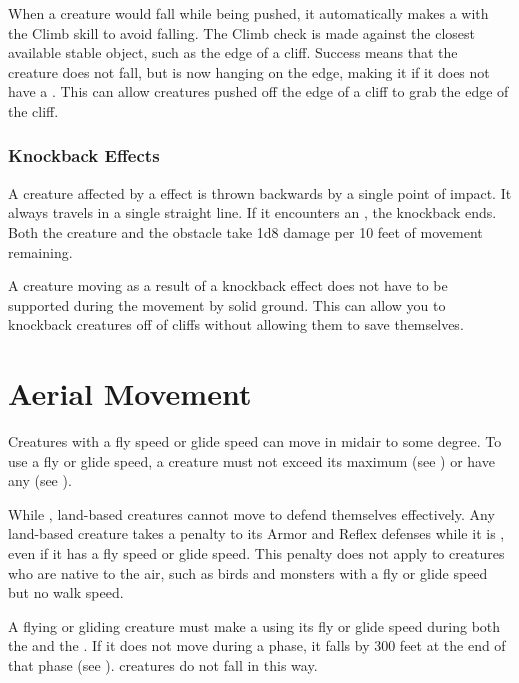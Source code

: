       When a creature would fall while being pushed, it automatically makes a  with the Climb skill to avoid falling.
      The Climb check is made against the closest available stable object, such as the edge of a cliff.
      Success means that the creature does not fall, but is now hanging on the edge, making it \unsteady if it does not have a .
      This can allow creatures pushed off the edge of a cliff to grab the edge of the cliff.

    \subsubsection{Knockback Effects}\label{Knockback Effects}
      A creature affected by a  effect is thrown backwards by a single point of impact.
      It always travels in a single straight line.
      If it encounters an , the knockback ends.
      Both the creature and the obstacle take 1d8 damage per 10 feet of movement remaining.

      A creature moving as a result of a knockback effect does not have to be supported during the movement by solid ground.
      This can allow you to knockback creatures off of cliffs without allowing them to save themselves.

\section{Aerial Movement}\label{Aerial Movement}
  Creatures with a fly speed or glide speed can move in midair to some degree.
  To use a fly or glide speed, a creature must not exceed its maximum  (see ) or have any  (see ).

  While , land-based creatures cannot move to defend themselves effectively.
  Any land-based creature takes a  penalty to its Armor and Reflex defenses while it is , even if it has a fly speed or glide speed.
  This penalty does not apply to creatures who are native to the air, such as birds and monsters with a fly or glide speed but no walk speed.

  A flying or gliding creature must make a  using its fly or glide speed during both the  and the .
  If it does not move during a phase, it falls by 300 feet at the end of that phase (see ).
   creatures do not fall in this way.

